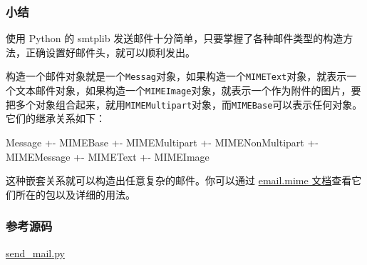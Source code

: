 \hypertarget{ux5c0fux7ed3}{%
\subsubsection{小结}\label{ux5c0fux7ed3}}

使用 Python 的 smtplib
发送邮件十分简单，只要掌握了各种邮件类型的构造方法，正确设置好邮件头，就可以顺利发出。

构造一个邮件对象就是一个\texttt{Messag}对象，如果构造一个\texttt{MIMEText}对象，就表示一个文本邮件对象，如果构造一个\texttt{MIMEImage}对象，就表示一个作为附件的图片，要把多个对象组合起来，就用\texttt{MIMEMultipart}对象，而\texttt{MIMEBase}可以表示任何对象。它们的继承关系如下：

\begin{pythoncode}
Message
+- MIMEBase
   +- MIMEMultipart
   +- MIMENonMultipart
      +- MIMEMessage
      +- MIMEText
      +- MIMEImage
\end{pythoncode}

这种嵌套关系就可以构造出任意复杂的邮件。你可以通过
\href{https://docs.python.org/3/library/email.mime.html}{email.mime
文档}查看它们所在的包以及详细的用法。

\hypertarget{ux53c2ux8003ux6e90ux7801}{%
\subsubsection{参考源码}\label{ux53c2ux8003ux6e90ux7801}}

\href{https://github.com/michaelliao/learn-python3/blob/master/samples/mail/send_mail.py}{send\_mail.py}

